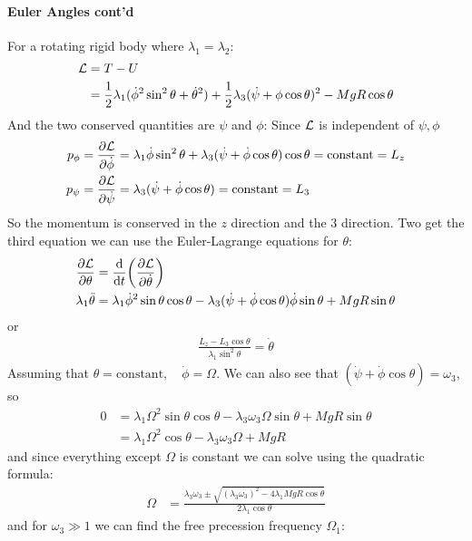 \documentclass[../main.tex]{subfiles}
\begin{document}
\paragraph*{Euler Angles cont'd} For a rotating rigid body where $\lambda_1 = \lambda_2$:
\begin{align*}
    \lagr &= T - U \\  
    &= \frac{1}{2} \lambda_1 (\dot \phi^2 \sin^2\theta + \dot\theta^2) 
    + \frac{1}{2} \lambda_3 (\dot\psi + \do\phi \cos\theta)^2
    - MgR \cos\theta
\end{align*}
And the two conserved quantities are $\psi$ and $\phi$: Since $\mathcal{L}$ is independent of $\psi,\phi$
\begin{align*}
    p_\phi = \pdv{\mathcal{L}}{\dot \phi} &= \lambda_1 \dot \phi \sin^2\theta + \lambda_3 (\dot\psi + \dot\phi \cos\theta) \cos\theta = \text{constant} = L_z \\
    p_\psi = \pdv{\mathcal{L}}{\dot \psi} &= \lambda_3 (\dot\psi + \dot\phi \cos\theta) = \text{constant} = L_3
\end{align*}
So the momentum is conserved in the $z$ direction and the $3$ direction. Two get the third equation
we can use the Euler-Lagrange equations for $\theta$:
\begin{align*}
    \pdv{\mathcal{L}}{\theta} &= \dv{t}(\pdv{\mathcal{L}}{\dot\theta}) \\
    \lambda_1 \ddot{\theta} &= \lambda_1 \dot \phi^2 \sin\theta \cos\theta 
        - \lambda_3 (\dot \psi + \dot\phi \cos\theta) \dot\phi \sin\theta + MgR \sin\theta
\end{align*}
or
\begin{align*}
    \frac{L_z - L_3 \cos\theta}{\lambda_1 \sin^2\theta} = \dot \theta
\end{align*}
Assuming that $\theta = \text{constant}, \quad \dot\phi = \Omega$. We can also see that 
$(\dot\psi + \dot\phi \cos\theta) = \omega_3$, so
\begin{align*}
    0 &= \lambda_1 \Omega^2 \sin\theta \cos\theta - \lambda_3 \omega_3 \Omega \sin\theta + MgR \sin\theta \\
    &= \lambda_1 \Omega^2 \cos\theta - \lambda_3 \omega_3 \Omega + MgR
\end{align*}
and since everything except $\Omega$ is constant we can solve using the quadratic formula:
\begin{align*}
    \Omega &= \frac{\lambda_3 \omega_3 \pm \sqrt{(\lambda_3 \omega_3)^2 - 4\lambda_1 MgR \cos\theta}}{2\lambda_1 \cos\theta}
\end{align*}
and for $\omega_3 \gg 1$ we can find the free precession frequency $\Omega_1$:
\end{document}
